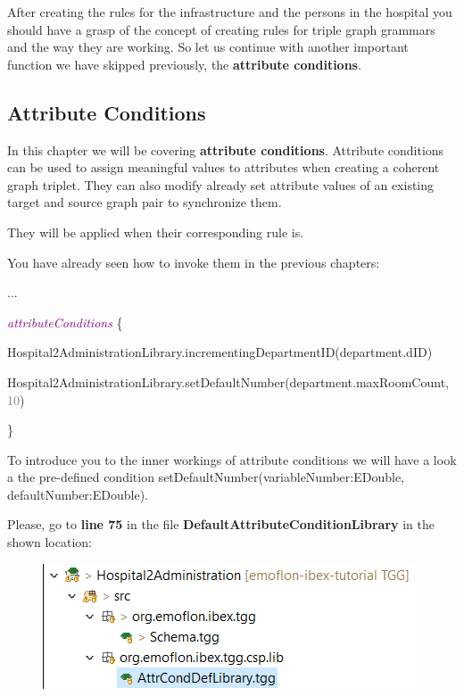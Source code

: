 {After creating the rules for the infrastructure and the persons in the hospital you should have a grasp of the concept of creating rules for triple graph grammars and the way they are working. So let us continue with another important function we have skipped previously, the \textbf{attribute conditions}. 

\clearpage

\subsection{Attribute Conditions}

In this chapter we will be covering \textbf{attribute conditions}. Attribute conditions can be used to assign meaningful values to attributes when creating a coherent graph triplet. They can also modify already set attribute values of an existing target and source graph pair to synchronize them.

They will be applied when their corresponding rule is.\newline

You have already seen how to invoke them in the previous chapters:

{

\hspace{0.5cm}...

\hspace{0.5cm}\textcolor{Purple}{\textit{attributeConditions}} \{

\hspace{1cm}Hospital2AdministrationLibrary.incrementingDepartmentID(department.dID)

\hspace{1cm}Hospital2AdministrationLibrary.setDefaultNumber(department.maxRoomCount, \textcolor{Grey}{10})

\hspace{0.5cm}\} \newline

}

To introduce you to the inner workings of attribute conditions we will have a look a the pre-defined condition \textsf{setDefaultNumber(variableNumber:EDouble, defaultNumber:EDouble)}.\newline

Please, go to \textbf{line 75} in the file \textbf{DefaultAttributeConditionLibrary} in the shown location:

\begin{figure}[h]
    \centering
    \includegraphics[scale=0.65 ]{pictures/locSetDefaultNumber.png}
    \caption{}
    \label{setDefaultNumber}
\end{figure}

}
